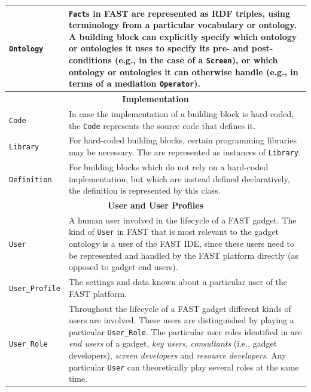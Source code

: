 \documentclass{article}
\begin{document}
\begin{small}
\begin{longtable}{|p{4.25cm}|p{10cm}|}
\texttt{Ontology} & \texttt{Fact}s in FAST are represented as RDF triples, using terminology from a particular vocabulary or ontology. A building block can explicitly specify which ontology or ontologies it uses to specify its pre- and post-conditions (e.g., in the case of a \texttt{Screen}), or which ontology or ontologies it can otherwise handle (e.g., in terms of a mediation \texttt{Operator}). \\ \hline
\multicolumn{2}{|c|}{\textbf{Implementation}} \\ \hline
\texttt{Code} & In case the implementation of a building block is hard-coded, the \texttt{Code} represents the source code that defines it. \\ \hline
\texttt{Library} & For hard-coded building blocks, certain programming libraries may be necessary. The are represented as instances of \texttt{Library}. \\ \hline
\texttt{Definition} & For building blocks which do not rely on a hard-coded implementation, but which are instead defined declaratively, the definition is represented by this class. \\ \hline
\multicolumn{2}{|c|}{\textbf{User and User Profiles}} \\ \hline
\texttt{User} & A human user involved in the lifecycle of a FAST gadget. The kind of \texttt{User} in FAST that is most relevant to the gadget ontology is a user of the FAST IDE, since these users need to be represented and handled by the FAST platform directly (as opposed to gadget end users). \\ \hline
\texttt{User\_Profile} & The settings and data known about a particular user of the FAST platform. \\ \hline
\texttt{User\_Role} & Throughout the lifecycle of a FAST gadget different kinds of users are involved. These users are distinguished by playing a particular \texttt{User\_Role}. The particular user roles identified in \cite{villoslada2010fast_requirements} are \emph{end users} of a gadget, \emph{key users}, \emph{consultants} (i.e., gadget developers), \emph{screen developers} and \emph{resource developers}. Any particular \texttt{User} can theoretically play several roles at the same time. \\ \hline

\end{longtable}
\end{small}
\end{document}
